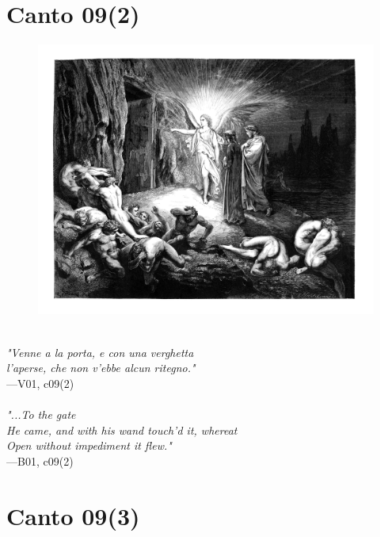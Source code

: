 \documentclass[../Dore_vision.tex]{subfiles}
\begin{document}
\newpage

\section{Canto 09(2)}

\begin{figure}[ht]
\centering
\includegraphics[height=\figsize]{illustrations/book_1/V01, c09(2).jpg}
\end{figure}

\begin{center}
\begin{minipage}{0.8\linewidth}
\textit{\\
"Venne a la porta, e con una verghetta\\l’aperse, che non v’ebbe alcun ritegno."} \\
—V01, c09(2) \\~\\
\textit{"...To the gate\\He came, and with his wand touch'd it, whereat\\Open without impediment it flew."} \\
—B01, c09(2)
\end{minipage}
\end{center}

\newpage

\section{Canto 09(3)}
\end{document}
